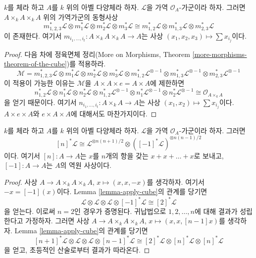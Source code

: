 \begin{lemma}
\label{lemma-apply-cube}
$k$를 체라 하고 $A$를 $k$ 위의 아벨 다양체라 하자. $\mathcal{L}$을 가역 $\mathcal{O}_A$-가군이라 하자.
그러면 $A \times_k A \times_k A$ 위의 가역가군의 동형사상
$$
m_{1, 2, 3}^*\mathcal{L} \otimes
m_1^*\mathcal{L} \otimes
m_2^*\mathcal{L} \otimes
m_3^*\mathcal{L} \cong
m_{1, 2}^*\mathcal{L} \otimes
m_{1, 3}^*\mathcal{L} \otimes
m_{2, 3}^*\mathcal{L}
$$
이 존재한다. 여기서 $m_{i_1, \ldots, i_t} : A \times_k A \times_k A \to A$는
사상 $(x_1, x_2, x_3) \mapsto \sum x_{i_j}$이다.
\end{lemma}

\begin{proof}
다음 차에 정육면체 정리(More on Morphisms, Theorem
\ref{more-morphisms-theorem-of-the-cube})를 적용하라.
$$
\mathcal{M} =
m_{1, 2, 3}^*\mathcal{L} \otimes
m_1^*\mathcal{L} \otimes
m_2^*\mathcal{L} \otimes
m_3^*\mathcal{L} \otimes
m_{1, 2}^*\mathcal{L}^{\otimes -1} \otimes
m_{1, 3}^*\mathcal{L}^{\otimes -1} \otimes
m_{2, 3}^*\mathcal{L}^{\otimes -1}
$$
이 적용이 가능한 이유는 $\mathcal{M}$을 $A \times A \times e = A \times A$에 제한하면
$$
n_{1, 2}^*\mathcal{L} \otimes
n_1^*\mathcal{L} \otimes
n_2^*\mathcal{L} \otimes
n_{1, 2}^*\mathcal{L}^{\otimes -1} \otimes
n_1^*\mathcal{L}^{\otimes -1} \otimes
n_2^*\mathcal{L}^{\otimes -1} \cong \mathcal{O}_{A \times_k A}
$$
을 얻기 때문이다. 여기서 $n_{i_1, \ldots, i_t} : A \times_k A \to A$는
사상 $(x_1, x_2) \mapsto \sum x_{i_j}$이다. $A \times e \times A$와 $e \times A \times A$에 대해서도 마찬가지이다.
\end{proof}

\begin{lemma}
\label{lemma-pullbacks-by-n}
$k$를 체라 하고 $A$를 $k$ 위의 아벨 다양체라 하자. $\mathcal{L}$을 가역 $\mathcal{O}_A$-가군이라 하자. 그러면
$$
[n]^*\mathcal{L} \cong
\mathcal{L}^{\otimes n(n + 1)/2} \otimes
([-1]^*\mathcal{L})^{\otimes n(n - 1)/2}
$$
이다. 여기서 $[n] : A \to A$는 $x$를 $n$개의 항을 갖는 $x + x + \ldots + x$로 보내고,
$[-1] : A \to A$는 $A$의 역원 사상이다.
\end{lemma}

\begin{proof}
사상 $A \to A \times_k A \times_k A$, $x \mapsto (x, x, -x)$를 생각하자. 여기서 $-x = [-1](x)$이다.
Lemma \ref{lemma-apply-cube}의 관계를 당기면
$$
\mathcal{L} \otimes
\mathcal{L} \otimes
\mathcal{L} \otimes
[-1]^*\mathcal{L} \cong
[2]^*\mathcal{L}
$$
을 얻는다. 이로써 $n = 2$인 경우가 증명된다. 귀납법으로 $1, 2, \ldots, n$에 대해 결과가 성립한다고 가정하자.
그러면 사상 $A \to A \times_k A \times_k A$, $x \mapsto (x, x, [n - 1]x)$를 생각하자.
Lemma \ref{lemma-apply-cube}의 관계를 당기면
$$
[n + 1]^*\mathcal{L} \otimes
\mathcal{L} \otimes
\mathcal{L} \otimes
[n - 1]^*\mathcal{L} \cong
[2]^*\mathcal{L} \otimes
[n]^*\mathcal{L} \otimes
[n]^*\mathcal{L}
$$
을 얻고, 초등적인 산술로부터 결과가 따라온다.
\end{proof}

